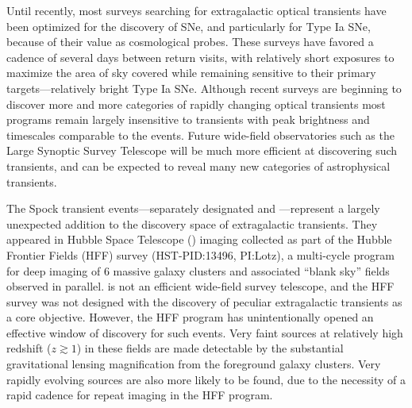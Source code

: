 Until recently, most surveys searching for extragalactic optical
transients have been optimized for the discovery of SNe, and
particularly for Type Ia SNe, because of their value as cosmological
probes\cite{Weinberg:2013}.  These surveys have favored a cadence of
several days between return visits, with relatively short exposures to
maximize the area of sky covered while remaining sensitive to their
primary targets---relatively bright Type Ia SNe.  Although recent
surveys are beginning to discover more and more categories of rapidly
changing optical transients\cite{Kasliwal:2011a,Drout:2014} most
programs remain largely insensitive to transients with peak brightness
and timescales comparable to the \spock events\cite{Berger:2013b}.
Future wide-field observatories such as the Large Synoptic Survey
Telescope\cite{Tyson:2002} will be much more efficient at discovering
such transients, and can be expected to reveal many new categories of
astrophysical transients.

The Spock transient events---separately designated \spockone and
\spocktwo---represent a largely unexpected addition to the discovery
space of extragalactic transients.  They appeared in Hubble Space
Telescope (\HST) imaging collected as part of the Hubble Frontier
Fields (HFF) survey (HST-PID:13496, PI:Lotz), a multi-cycle program
for deep imaging of 6 massive galaxy clusters and associated ``blank
sky'' fields observed in parallel.  \HST is not an efficient
wide-field survey telescope, and the HFF survey was not designed with
the discovery of peculiar extragalactic transients as a core
objective.  However, the HFF program has unintentionally opened an
effective window of discovery for such events.  Very faint sources at
relatively high redshift ($z\gtrsim1$) in these fields are made
detectable by the substantial gravitational lensing magnification from
the foreground galaxy clusters.  Very rapidly evolving sources are
also more likely to be found, due to the necessity of a rapid cadence
for repeat imaging in the HFF program.

